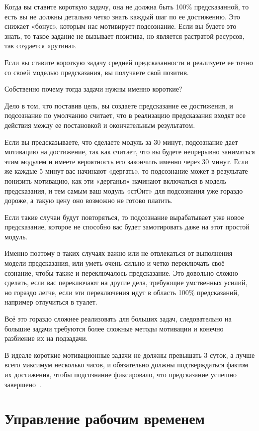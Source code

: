 \documentclass{../industrial-development}
\begin{document}
Когда вы ставите короткую задачу, она не должна быть 100\% предсказанной, то есть вы не должны детально четко знать каждый шаг по ее достижению. Это снижает «бонус», которым нас мотивирует подсознание. Если вы будете это знать, то такое задание не вызывает позитива, но является растратой ресурсов, так создается «рутина».

Если вы ставите короткую задачу средней предсказанности и реализуете ее точно со своей моделью предсказания, вы получаете свой позитив.

Собственно почему тогда задачи нужны именно короткие?

Дело в том, что поставив цель, вы создаете предсказание ее достижения, и подсознание по умолчанию считает, что в реализацию предсказания входят все действия между ее постановкой и окончательным результатом.

Если вы предсказываете, что сделаете модуль за 30 минут, подсознание дает мотивацию на достижение, так как считает, что вы будете непрерывно заниматься этим модулем и имеете вероятность его закончить именно через 30 минут.
Если же каждые 5 минут вас начинают «дергать», то подсознание может в результате понизить мотивацию, как эти «дерганья» начинают включаться в модель предсказания, и тем самым ваш модуль «стОит» для подсознания уже гораздо дороже, а такую цену оно возможно не готово платить.

Если такие случаи будут повторяться, то подсознание вырабатывает уже новое предсказание, которое не способно вас будет замотировать даже на этот простой модуль.

Именно поэтому в таких случаях важно или не отвлекаться от выполнения модели предсказания, или уметь очень сильно и четко переключать своё сознание, чтобы также и переключалось предсказание. Это довольно сложно сделать, если вас переключают на другие дела, требующие умственных усилий, но гораздо легче, если эти переключения идут в область 100\% предсказаний, например отлучиться в туалет.

Всё это гораздо сложнее реализовать для больших задач, следовательно на большие задачи требуются более сложные методы мотивации и конечно разбиение их на подзадачи.

В идеале короткие мотивационные задачи не должны превышать 3 суток, а лучше всего максимум несколько часов, и обязательно должны подтверждаться фактом их достижения, чтобы подсознание фиксировало, что предсказание успешно завершено~\cite{TasksHabr}.

\section{Управление рабочим временем}
\end{document}
